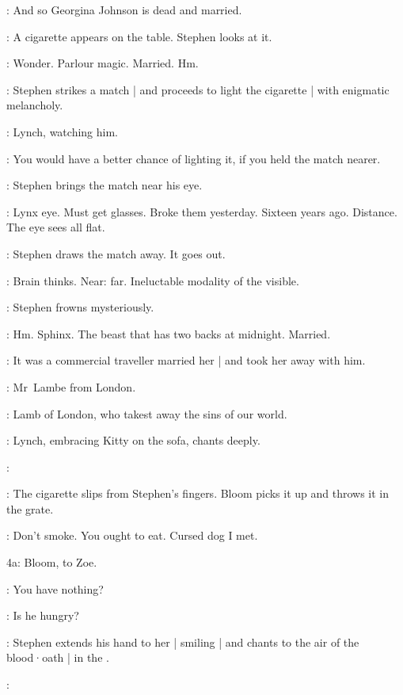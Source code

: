 \Stephen:
And so Georgina Johnson is dead and married.

:
A cigarette appears on the table.
Stephen looks at it.

\Stephen:
Wonder.
Parlour magic.
Married.
Hm.

:
Stephen strikes a match |
and proceeds to light the cigarette |
with enigmatic melancholy.

:
Lynch,
watching him.

\Lynch:
You would have a better chance of lighting it,
if you held the match nearer.

:
Stephen brings the match near his eye.

\Stephen:
Lynx eye.
Must get glasses.
Broke them yesterday.
Sixteen years ago.
Distance.
The eye sees all flat.

:
Stephen draws the match away.
It goes out.

\Stephen:
Brain thinks.
Near:
far.
Ineluctable modality of the visible.

:
Stephen frowns mysteriously.

\Stephen:
Hm.
Sphinx.
The beast that has two backs at midnight.
Married.

\Zoe:
It was a commercial traveller married her |
and took her away with him.

\Florry:
Mr~Lambe from London.

\Stephen:
Lamb of London,
who takest away the sins of our world.

:
Lynch,
embracing Kitty on the sofa,
chants deeply.

\Lynch:

:
The cigarette slips from Stephen's fingers.
Bloom picks it up and throws it in the grate.

\Bloom:
Don't smoke.
You ought to eat.
Cursed dog I met.

\N4a:
Bloom, to Zoe.

\Bloom:
You have nothing?

\Zoe:
Is he hungry?

:
Stephen extends his hand to her |
smiling |
and chants to the air of the blood·oath |
in the .

\Stephen:
\begin{verse}
\end{verse}

